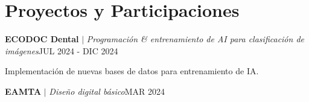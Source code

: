\section{Proyectos y Participaciones}
    \resumeSubHeadingListStart

        \resumeProjectHeading
        {\textbf{ECODOC Dental} $|$ \footnotesize\emph{Programación \& entrenamiento de AI para clasificación de imágenes}}{JUL 2024 - DIC 2024}
        \resumeItemListStart
            \begin{multicols}{3}
            \resumeItem{}Implementación de nuevas bases de datos para entrenamiento de IA.
            \end{multicols}
          \resumeItemListEnd


        {\textbf{EAMTA} $|$ \footnotesize\emph{Diseño digital básico}}{MAR 2024}
    
          
